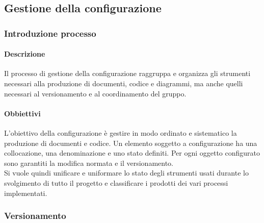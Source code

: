 	\subsection{Gestione della configurazione}
		\subsubsection{Introduzione processo}
			\paragraph{Descrizione}
				Il processo di gestione della configurazione raggruppa e organizza gli strumenti necessari alla produzione di documenti, codice e diagrammi, ma anche quelli necessari al versionamento e al coordinamento del gruppo.
			\paragraph{Obbiettivi}
				L’obiettivo della configurazione è gestire in modo ordinato e sistematico la produzione di documenti e codice. Un elemento soggetto a configurazione ha una collocazione, una denominazione e uno stato definiti. Per ogni oggetto configurato sono garantiti la modifica normata e il versionamento. \\
				Si vuole quindi unificare e uniformare lo stato degli strumenti usati durante lo svolgimento di tutto il progetto e classificare i prodotti dei vari processi implementati.
		\subsubsection{Versionamento}

